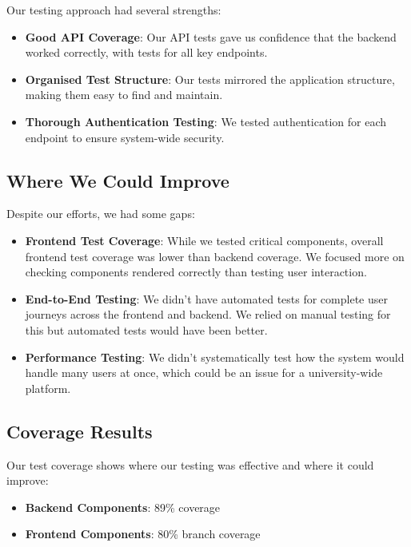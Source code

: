 Our testing approach had several strengths:

\begin{itemize}
    \item \textbf{Good API Coverage}: Our API tests gave us confidence that the backend worked correctly, with tests for all key endpoints.
    
    \item \textbf{Organised Test Structure}: Our tests mirrored the application structure, making them easy to find and maintain.
    
    \item \textbf{Thorough Authentication Testing}: We tested authentication for each endpoint to ensure system-wide security.
\end{itemize}

\subsection{Where We Could Improve}

Despite our efforts, we had some gaps:

\begin{itemize}
    \item \textbf{Frontend Test Coverage}: While we tested critical components, overall frontend test coverage was lower than backend coverage. We focused more on checking components rendered correctly than testing user interaction.
    
    \item \textbf{End-to-End Testing}: We didn't have automated tests for complete user journeys across the frontend and backend. We relied on manual testing for this but automated tests would have been better.
    
    \item \textbf{Performance Testing}: We didn't systematically test how the system would handle many users at once, which could be an issue for a university-wide platform.
\end{itemize}

\subsection{Coverage Results}

Our test coverage shows where our testing was effective and where it could improve:
 
\begin{itemize}
    \item \textbf{Backend Components}: 89\% coverage
    \item \textbf{Frontend Components}: 80\% branch coverage
\end{itemize}

